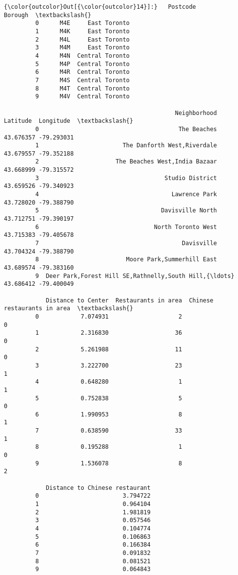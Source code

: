 \documentclass[11pt]{article}
\begin{document}
\begin{Verbatim}[commandchars=\\\{\}]
{\color{outcolor}Out[{\color{outcolor}14}]:}   Postcode          Borough  \textbackslash{}
         0      M4E     East Toronto   
         1      M4K     East Toronto   
         2      M4L     East Toronto   
         3      M4M     East Toronto   
         4      M4N  Central Toronto   
         5      M4P  Central Toronto   
         6      M4R  Central Toronto   
         7      M4S  Central Toronto   
         8      M4T  Central Toronto   
         9      M4V  Central Toronto   
         
                                                 Neighborhood   Latitude  Longitude  \textbackslash{}
         0                                        The Beaches  43.676357 -79.293031   
         1                        The Danforth West,Riverdale  43.679557 -79.352188   
         2                      The Beaches West,India Bazaar  43.668999 -79.315572   
         3                                    Studio District  43.659526 -79.340923   
         4                                      Lawrence Park  43.728020 -79.388790   
         5                                   Davisville North  43.712751 -79.390197   
         6                                 North Toronto West  43.715383 -79.405678   
         7                                         Davisville  43.704324 -79.388790   
         8                         Moore Park,Summerhill East  43.689574 -79.383160   
         9  Deer Park,Forest Hill SE,Rathnelly,South Hill,{\ldots}  43.686412 -79.400049   
         
            Distance to Center  Restaurants in area  Chinese restaurants in area  \textbackslash{}
         0            7.074931                    2                            0   
         1            2.316830                   36                            0   
         2            5.261988                   11                            0   
         3            3.222700                   23                            1   
         4            0.648280                    1                            1   
         5            0.752838                    5                            0   
         6            1.990953                    8                            1   
         7            0.638590                   33                            1   
         8            0.195288                    1                            0   
         9            1.536078                    8                            2   
         
            Distance to Chinese restaurant  
         0                        3.794722  
         1                        0.964104  
         2                        1.981819  
         3                        0.057546  
         4                        0.104774  
         5                        0.106863  
         6                        0.166384  
         7                        0.091832  
         8                        0.081521  
         9                        0.064843  
\end{Verbatim}
            
\end{document}
